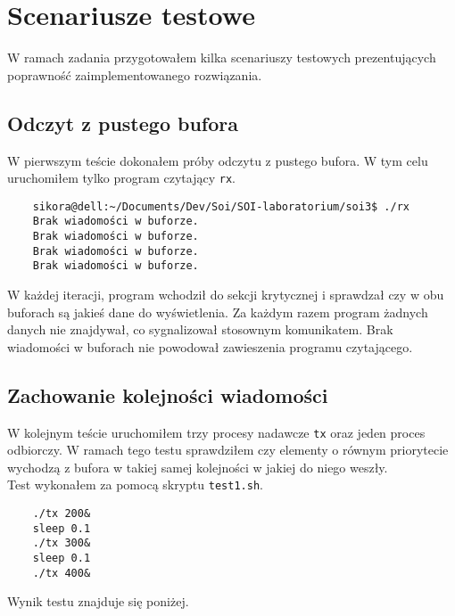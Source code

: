 \documentclass{mwrep}
\begin{document}
\section{Scenariusze testowe}
W ramach zadania przygotowałem kilka scenariuszy testowych prezentujących poprawność
zaimplementowanego rozwiązania.

\subsection{Odczyt z pustego bufora}
W pierwszym teście dokonałem próby odczytu z pustego bufora. W tym celu uruchomiłem tylko program czytający \texttt{rx}.

\begin{verbatim}
    sikora@dell:~/Documents/Dev/Soi/SOI-laboratorium/soi3$ ./rx
    Brak wiadomości w buforze.
    Brak wiadomości w buforze.
    Brak wiadomości w buforze.
    Brak wiadomości w buforze.
\end{verbatim}

W każdej iteracji, program wchodził do sekcji krytycznej i sprawdzał czy w obu buforach są jakieś dane
do wyświetlenia. Za każdym razem program żadnych danych nie znajdywał, co sygnalizował stosownym komunikatem.
Brak wiadomości w buforach nie powodował zawieszenia programu czytającego.

\subsection{Zachowanie kolejności wiadomości}
W kolejnym teście uruchomiłem trzy procesy nadawcze \texttt{tx} oraz jeden proces odbiorczy. W ramach tego testu
sprawdziłem czy elementy o równym priorytecie wychodzą z bufora w takiej samej kolejności w jakiej do niego weszły.\\

\noindent Test wykonałem za pomocą skryptu \texttt{test1.sh}.
\begin{verbatim}
    ./tx 200&
    sleep 0.1
    ./tx 300&
    sleep 0.1
    ./tx 400&
\end{verbatim}

Wynik testu znajduje się poniżej.
\end{document}
